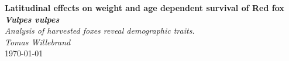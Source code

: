 \documentclass[12pt,a4paper,final,abstract=true,headings=small]{scrartcl}
\begin{document}
\begin{titlepage}
    \begin{center}
        \textbf{Latitudinal effects on weight and age dependent survival of Red fox \emph{Vulpes vulpes}} \\
        \vspace*{2cm}
        \emph{Analysis of harvested foxes reveal demographic traits.} \\
        \vspace*{5cm}
        \emph{\Large Tomas Willebrand} \\
        \today
    \end{center}
\end{titlepage}
\end{document}
